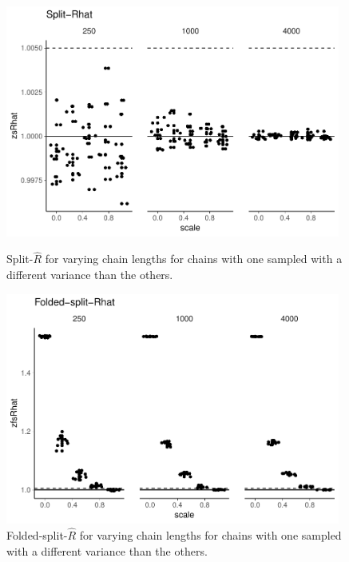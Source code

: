\documentclass[american,]{article}
\theoremstyle{definition}
\begin{document}
\begin{figure}[tp]
  \centering
  \begin{minipage}{0.48\textwidth}
  \includegraphics[width=0.98\textwidth]{graphics/zsrhat-scaled-chain-1.pdf}
  \caption{Split-\(\widehat{R}\) for varying chain lengths
    for chains with one sampled with a different variance than the others.}
  \label{fig:zsrhat-scaled-chain-1}
\end{minipage}
\hfill
  \begin{minipage}{0.48\textwidth}
  \includegraphics[width=0.98\textwidth]{graphics/zfsrhat-scaled-chain-1.pdf}
  \caption{Folded-split-\(\widehat{R}\) for varying chain lengths
    for chains with one sampled with a different variance than the others.}
  \label{fig:zfsrhat-scaled-chain-1}
\end{minipage}
\end{figure}
\end{document}
